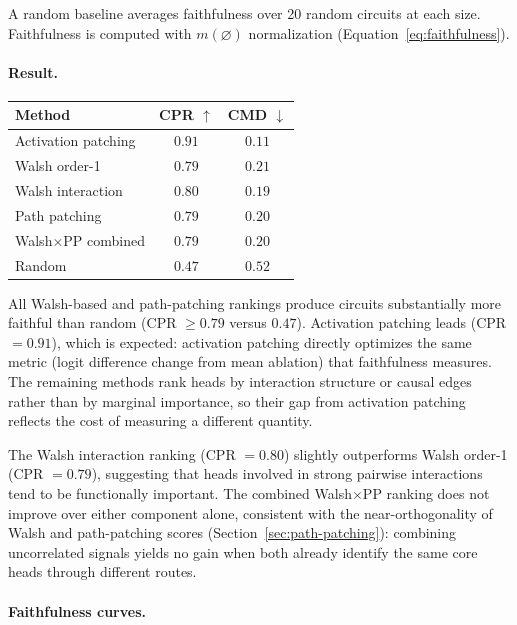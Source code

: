 A random baseline averages faithfulness over 20 random circuits at each
size. Faithfulness is computed with $m(\varnothing)$ normalization
(Equation~\ref{eq:faithfulness}).

\paragraph{Result.}

\medskip

\begin{tabular}{lcc}
\toprule
Method & CPR $\uparrow$ & CMD $\downarrow$ \\
\midrule
Activation patching         & $0.91$ & $0.11$ \\
Walsh order-1               & $0.79$ & $0.21$ \\
Walsh interaction           & $0.80$ & $0.19$ \\
Path patching               & $0.79$ & $0.20$ \\
Walsh$\times$PP combined    & $0.79$ & $0.20$ \\
Random                      & $0.47$ & $0.52$ \\
\bottomrule
\end{tabular}

\medskip

All Walsh-based and path-patching rankings produce circuits substantially
more faithful than random (CPR $\geq 0.79$ versus $0.47$). Activation
patching leads (CPR $= 0.91$), which is expected: activation patching
directly optimizes the same metric (logit difference change from mean
ablation) that faithfulness measures. The remaining methods rank heads
by interaction structure or causal edges rather than by marginal
importance, so their gap from activation patching reflects the cost of
measuring a different quantity.

The Walsh interaction ranking (CPR $= 0.80$) slightly outperforms Walsh
order-1 (CPR $= 0.79$), suggesting that heads involved in strong
pairwise interactions tend to be functionally important. The combined
Walsh$\times$PP ranking does not improve over either component alone,
consistent with the near-orthogonality of Walsh and path-patching scores
(Section~\ref{sec:path-patching}): combining uncorrelated signals yields
no gain when both already identify the same core heads through different
routes.

\paragraph{Faithfulness curves.}

